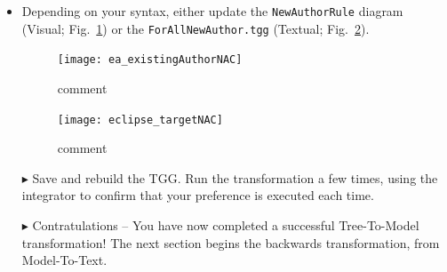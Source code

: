 \begin{itemize}

\item Depending on your syntax, either update the \texttt{NewAuthorRule} diagram (Visual; Fig.~\ref{ea:existingAuthorNAC}) or the \texttt{ForAllNewAuthor.tgg} 
(Textual; Fig.~\ref{eclipse:existingAuthorNAC}).

\begin{figure}[htbp]
\begin{center}
  \texttt{[image: ea\_existingAuthorNAC]}
  \caption{comment}
  \label{ea:existingAuthorNAC}
\end{center}
\end{figure}

\begin{figure}[htbp]
\begin{center}
  \texttt{[image: eclipse\_targetNAC]}
  \caption{comment}
  \label{eclipse:existingAuthorNAC}
\end{center}
\end{figure}


\newpage

\item[$\blacktriangleright$] Save and rebuild the TGG. Run the transformation a few times, using the integrator to confirm that your preference is executed each
time.

\item[$\blacktriangleright$] Contratulations -- You have now completed a successful Tree-To-Model transformation! The next section begins the backwards
transformation, from Model-To-Text.

\end{itemize}
